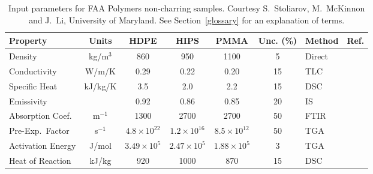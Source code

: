 \begin{table}[h!]
\caption[FAA non-charring polymer properties]{Input parameters for FAA Polymers non-charring samples. Courtesy S.~Stoliarov, M.~McKinnon and J.~Li, University of Maryland.
See Section~\ref{glossary} for an explanation of terms.}
\begin{center}
\begin{tabular}{|l|c|c|c|c|c|l|l|}
\hline
Property                    & Units         & HDPE                  & HIPS                  & PMMA                  & Unc. (\%) & Method                &  Ref.                         \\ \hline \hline
Density                     & kg/m$^3$      & 860                   & 950                   & 1100                  & 5         & Direct                &  \cite{Stoliarov:CF2009}      \\ \hline
Conductivity                & W/m/K         & 0.29                  & 0.22                  & 0.20                  & 15        & TLC                   &  \cite{Stoliarov:CF2009}      \\ \hline
Specific Heat               & kJ/kg/K       & 3.5                   & 2.0                   & 2.2                   & 15        & DSC                   &  \cite{Stoliarov:PDS2008}     \\ \hline
Emissivity                  &               & 0.92                  & 0.86                  & 0.85                  & 20        & IS                    &  \cite{Hallman:PES1974}       \\ \hline
Absorption Coef.            & m$^{-1}$      & 1300                  & 2700                  & 2700                  & 50        & FTIR                  &  \cite{Tsilingiris:ECM2003}   \\ \hline
Pre-Exp.~Factor             & s$^{-1}$      & $4.8 \times 10^{22}$  & $1.2 \times 10^{16}$  & $8.5 \times 10^{12}$  & 50        & TGA                   &  \cite{Stoliarov:CF2009}      \\ \hline
Activation Energy           & J/mol       & $3.49 \times 10^{5}$  & $2.47 \times 10^{5}$  & $1.88 \times 10^{5}$  & 3         & TGA                   &  \cite{Stoliarov:CF2009}      \\ \hline
Heat of Reaction            & kJ/kg         & 920                   & 1000                  & 870                   & 15        & DSC                   &  \cite{Stoliarov:PDS2008}     \\ \hline
\end{tabular}
\end{center}
\label{FAA_Properties}
\end{table}




